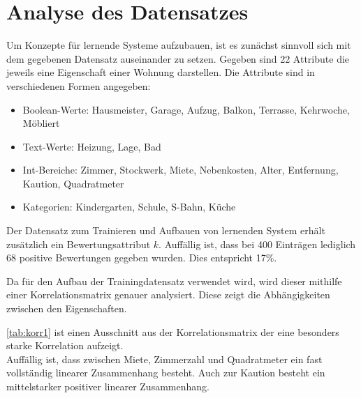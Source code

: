 \section{Analyse des Datensatzes}\label{sec:analyse}
Um Konzepte für lernende Systeme aufzubauen, ist es zunächst sinnvoll sich mit 
dem gegebenen Datensatz auseinander zu setzen. 
Gegeben sind 22 Attribute die jeweils eine Eigenschaft einer Wohnung darstellen. 
Die Attribute sind in verschiedenen Formen angegeben: 
\begin{itemize}
    \item Boolean-Werte: Hausmeister, Garage, Aufzug, Balkon, Terrasse, Kehrwoche, Möbliert
    \item Text-Werte: Heizung, Lage, Bad
    \item Int-Bereiche: Zimmer, Stockwerk, Miete, Nebenkosten, Alter, Entfernung, Kaution, Quadratmeter
    \item Kategorien: Kindergarten, Schule, S-Bahn, Küche
\end{itemize}

Der Datensatz zum Trainieren und Aufbauen von lernenden System erhält zusätzlich 
ein Bewertungsattribut $k$. 
Auffällig ist, dass bei 400 Einträgen lediglich 68 positive Bewertungen gegeben wurden. 
Dies entspricht 17\%. 

Da für den Aufbau der Trainingdatensatz verwendet wird, wird dieser mithilfe einer Korrelationsmatrix 
genauer analysiert. Diese zeigt die Abhängigkeiten zwischen den Eigenschaften. 

\autoref{tab:korr1} ist einen Ausschnitt aus der Korrelationsmatrix der eine besonders starke Korrelation aufzeigt. \\
Auffällig ist, dass zwischen Miete, Zimmerzahl und Quadratmeter ein fast vollständig linearer Zusammenhang
besteht. Auch zur Kaution besteht ein mittelstarker positiver linearer Zusammenhang.

